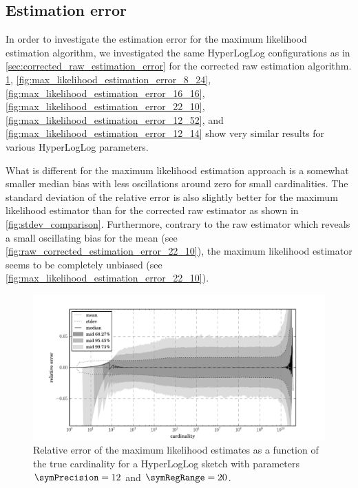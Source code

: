 \documentclass[a4paper]{scrartcl}
\begin{document}
\subsection{Estimation error}
\label{sec:maximum_likelihood_estimation_error}
In order to investigate the estimation error for the maximum likelihood estimation algorithm, we investigated the same HyperLogLog configurations as in \cref{sec:corrected_raw_estimation_error} for the corrected raw estimation algorithm. \cref{fig:max_likelihood_estimation_error_12_20}, \cref{fig:max_likelihood_estimation_error_8_24},  \cref{fig:max_likelihood_estimation_error_16_16}, \cref{fig:max_likelihood_estimation_error_22_10}, \cref{fig:max_likelihood_estimation_error_12_52}, and \cref{fig:max_likelihood_estimation_error_12_14} show very similar results for various HyperLogLog parameters. 

What is different for the maximum likelihood estimation approach is a somewhat smaller median bias with less oscillations around zero for small cardinalities. The standard deviation of the relative error is also slightly better for the maximum likelihood estimator than for the corrected raw estimator as shown in \cref{fig:stdev_comparison}. Furthermore, contrary to the raw estimator which reveals a small oscillating bias for the mean (see \cref{fig:raw_corrected_estimation_error_22_10}), the maximum likelihood estimator seems to be completely unbiased (see \cref{fig:max_likelihood_estimation_error_22_10}).

\begin{figure}
\centering
\includegraphics[width=1\textwidth]{max_likelihood_estimate_12_20}
\caption{Relative error of the maximum likelihood estimates as a function of the true cardinality for a HyperLogLog sketch with parameters $\symPrecision = 12$ and $\symRegRange=20$.}
\label{fig:max_likelihood_estimation_error_12_20}
\end{figure}
\end{document}
